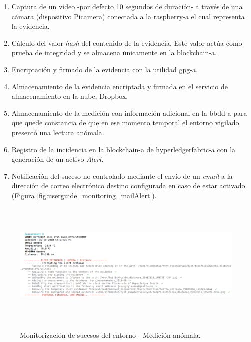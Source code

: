 \documentclass[12pt,a4paper, twoside]{report}
\begin{document}
\begin{itemize}
	 	 	\begin{enumerate}
				\item Captura de un vídeo -por defecto 10 segundos de duración- a través de una cámara (dispositivo Picamera) conectada a la \gls{raspberry-a} el cual representa la evidencia.
				\item Cálculo del valor \textit{hash} del contenido de la evidencia. Este valor actúa como prueba de integridad y se almacena únicamente en la \gls{blockchain-a}. 
				\item Encriptación y firmado de la evidencia con la utilidad \gls{gpg-a}.
				\item Almacenamiento de la evidencia encriptada y firmada en el servicio de almacenamiento en la nube, Dropbox.
				\item Almacenamiento de la medición con información adicional en la \gls{bbdd-a} para que quede constancia de que en ese momento temporal el entorno vigilado presentó una lectura anómala.				
				\item Registro de la incidencia	en la \gls{blockchain-a} de \gls{hyperledgerfabric-a} con la generación de un activo \textit{Alert}. 		
				\item Notificación del suceso no controlado mediante el envío de un \textit{email} a la dirección de correo electrónico destino configurada en caso de estar activado (Figura \ref{fig:userguide_monitoring_mailAlert}).
			\end{enumerate}
			
			\begin{figure}[!ht]   
				\caption{Monitorización de sucesos del entorno - Medición anómala.} 
				\begin{center} 
					\includegraphics[width=17cm,height=6cm]{Images/userGuide/monitoring/measurementAlert} \\
					\label{fig:userguide_monitoring_measurementAlert} 
				\end{center}  
			\end{figure}	 
		
	 \end{itemize}
	 
\end{document}
